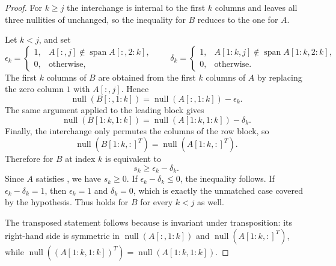 \documentclass[final]{siamart1116}
\numberwithin{theorem}{section}
\DeclareMathOperator{\nl}{null}
\begin{document}
\begin{proof}
  For $k \ge j$ the interchange is internal to the first $k$ columns and leaves all three nullities of  unchanged, so the inequality for $B$ reduces to the one for $A$.

  Let $k < j$, and set
  \[
    \epsilon_k =
    \begin{cases}
      1, & A[:,j] \notin \operatorname{span} A[:,2:k],\\
      0, & \text{otherwise},
    \end{cases}
    \qquad
    \delta_k =
    \begin{cases}
      1, & A[1:k,j] \notin \operatorname{span} A[1:k,2:k],\\
      0, & \text{otherwise}.
    \end{cases}
  \]
  The first $k$ columns of $B$ are obtained from the first $k$ columns of $A$ by replacing the zero column $1$ with $A[:,j]$. Hence
  \[
    \nl(B[:,1:k]) = \nl(A[:,1:k]) - \epsilon_k.
  \]
  The same argument applied to the leading block gives
  \[
    \nl(B[1:k,1:k]) = \nl(A[1:k,1:k]) - \delta_k.
  \]
  Finally, the interchange only permutes the columns of the row block, so
  \[
    \nl({B[1:k,:]}^T) = \nl({A[1:k,:]}^T).
  \]
  Therefore  for $B$ at index $k$ is equivalent to
  \[
    s_k \ge \epsilon_k - \delta_k.
  \]
  Since $A$ satisfies , we have $s_k \ge 0$. If $\epsilon_k - \delta_k \le 0$, the inequality follows. If $\epsilon_k - \delta_k = 1$, then $\epsilon_k = 1$ and $\delta_k = 0$, which is exactly the unmatched case covered by the hypothesis. Thus  holds for $B$ for every $k < j$ as well.

  The transposed statement follows because  is invariant under transposition: its right-hand side is symmetric in $\nl(A[:,1:k])$ and $\nl({A[1:k,:]}^T)$, while $\nl((A[1:k,1:k])^T) = \nl(A[1:k,1:k])$.
\end{proof}

\end{document}
